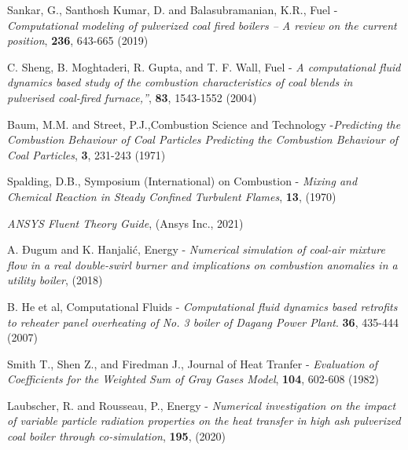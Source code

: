 \documentclass{webofc}
\begin{document}
\begin{thebibliography}{}
Sankar, G., Santhosh Kumar, D. and Balasubramanian, K.R., Fuel -\textit{Computational modeling of pulverized coal fired boilers – A review on the current position}, \textbf{236}, 643-665 (2019)

C. Sheng, B. Moghtaderi, R. Gupta, and T. F. Wall, Fuel - \textit{A computational fluid dynamics based study of the combustion characteristics of coal blends in pulverised coal-fired furnace,”}, \textbf{83}, 1543-1552 (2004)

Baum, M.M. and Street, P.J.,Combustion Science and Technology -\textit{Predicting the Combustion Behaviour of Coal Particles Predicting the Combustion Behaviour of Coal Particles}, \textbf{3}, 231-243 (1971) 


Spalding, D.B., Symposium (International) on Combustion - \textit{Mixing and Chemical Reaction in Steady Confined Turbulent Flames}, \textbf{13}, (1970)

\textit{ANSYS Fluent Theory Guide}, (Ansys Inc., 2021)

A. Đugum and K. Hanjalić, Energy - \textit{Numerical simulation of coal-air mixture flow in a real double-swirl burner and implications on combustion anomalies in a utility boiler}, (2018)

B. He et al, Computational Fluids - \textit{Computational fluid dynamics based retrofits to reheater panel overheating of No. 3
boiler of Dagang Power Plant}. \textbf{36}, 435-444 (2007)

Smith T., Shen Z., and Firedman J., Journal of Heat Tranfer - \textit{Evaluation of Coefficients for the Weighted Sum of Gray Gases Model}, \textbf{104}, 602-608 (1982)

Laubscher, R. and Rousseau, P., Energy - \textit{Numerical investigation on the impact of variable particle radiation properties on the heat transfer in high ash pulverized coal boiler through co-simulation}, \textbf{195}, (2020)




\end{thebibliography}
\end{document}
